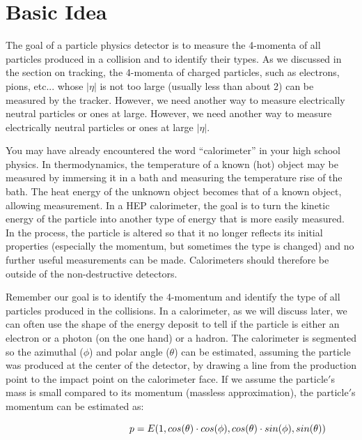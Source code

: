 \section{Basic Idea}

\noindent
The goal of a particle physics detector is to measure the 4-momenta of all particles produced in a collision and to identify their types.  As we discussed in the section on tracking, the 4-momenta of charged particles, such as electrons, pions, etc... whose $\left | \eta  \right |$ is not too large (usually less than about 2) can be measured by the tracker. However, we need another way to measure electrically neutral particles or ones at large. However, we need another way to measure electrically neutral particles or ones at large $\left | \eta  \right |$.

\;
\noindent
You may have already encountered the word ``calorimeter'' in your high school physics.  In thermodynamics, the temperature of a known (hot) object may be measured by immersing it in a bath and measuring the temperature rise of the bath.  The heat energy of the unknown object becomes that of a known object, allowing measurement. In a HEP calorimeter, the goal is to turn the kinetic energy of the particle into another type of energy that is more easily measured. In the process, the particle is altered so that it no longer reflects its initial properties (especially the momentum, but sometimes the type is changed) and no further useful measurements can be made.  Calorimeters should therefore be outside of the non-destructive detectors.

\;
\noindent
Remember our goal is to identify the 4-momentum and identify the type of all particles produced in the collisions. In a calorimeter, as we will discuss later, we can often use the shape of the energy deposit to tell if the particle is  either an electron or a photon (on the one hand) or a hadron. The calorimeter is segmented so the azimuthal ($\phi$) and polar angle ($\theta$) can be estimated, assuming the particle was produced at the center of the detector, by drawing a line from the production point to the impact point on the calorimeter face. If we assume the particle$'$s mass is small compared to its momentum (massless approximation), the particle$'$s momentum can be estimated as:

\begin{equation}\hspace{34 mm}
p = E(1,cos(\theta ) \cdot cos(\phi ),cos(\theta ) \cdot sin(\phi ),sin(\theta ))
\end{equation}


